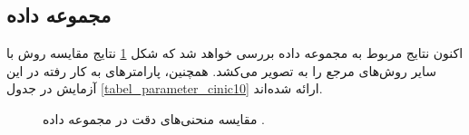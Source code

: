 \FloatBarrier
\subsection{
	مجموعه داده
}

اکنون نتایج مربوط به مجموعه داده
بررسی خواهد شد که شکل
\ref{result_cinic10}
نتایج مقایسه روش
با سایر روش‌های مرجع را به تصویر می‌کشد.
همچنین، پارامترهای به کار رفته در این آزمایش در جدول
\ref{tabel_parameter_cinic10}
ارائه شده‌اند.

\begin{figure}[t]
	\centering
	\hspace{0.8mm}
	\caption{
		مقایسه منحنی‌های دقت در مجموعه داده
		.
	}
	\label{result_cinic10}
\end{figure}


